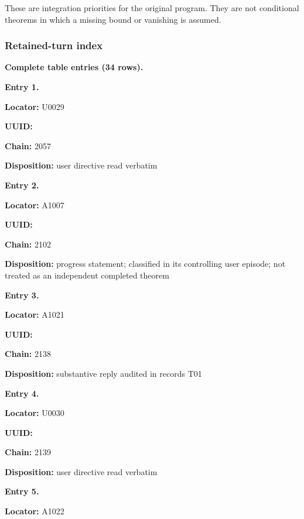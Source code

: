 These are integration priorities for the original program. They are not
conditional theorems in which a missing bound or vanishing is assumed.

\subsubsection{Retained-turn index}\label{retained-turn-index}

\textbf{Complete table entries (34 rows).}


\textbf{Entry 1.}

\textbf{Locator:} U0029

\textbf{UUID:} \protect{}

\textbf{Chain:} 2057

\textbf{Disposition:} user directive read verbatim


\textbf{Entry 2.}

\textbf{Locator:} A1007

\textbf{UUID:} \protect{}

\textbf{Chain:} 2102

\textbf{Disposition:} progress statement; classified in its controlling
user episode; not treated as an independent completed theorem


\textbf{Entry 3.}

\textbf{Locator:} A1021

\textbf{UUID:} \protect{}

\textbf{Chain:} 2138

\textbf{Disposition:} substantive reply audited in records T01


\textbf{Entry 4.}

\textbf{Locator:} U0030

\textbf{UUID:} \protect{}

\textbf{Chain:} 2139

\textbf{Disposition:} user directive read verbatim


\textbf{Entry 5.}

\textbf{Locator:} A1022

